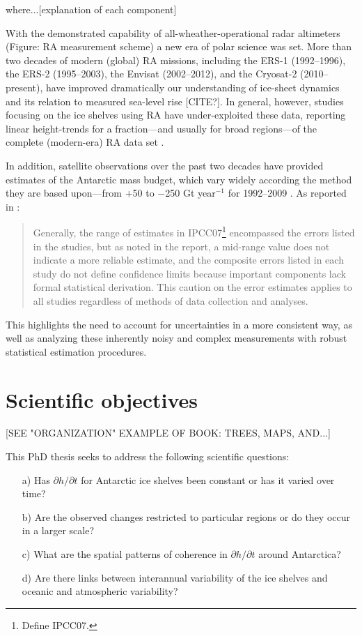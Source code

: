where...[explanation of each component]

With the demonstrated capability of all-wheather-operational radar altimeters
(Figure: RA measurement scheme)
a new era of polar science was set. More than two decades of modern (global) RA missions,
including the ERS-1 (1992--1996), the ERS-2 (1995--2003), the Envisat (2002--2012), and
the Cryosat-2 (2010--present), have improved dramatically our understanding of ice-sheet
dynamics and its relation to measured sea-level rise [CITE?]. In general, however,
studies focusing on the ice shelves using RA have under-exploited these data,
reporting linear height-trends for a fraction---and usually for broad regions---of the complete (modern-era) RA data set \parencite{Shepherd2003, Shepherd2010, Zwally2005}.

In addition, satellite observations over the past two decades have provided estimates of
the Antarctic mass budget, which vary widely according the method they are based upon---from
$+$50 to $-$250 Gt year$^{-1}$ for 1992--2009 \parencite{Zwally2011}. As reported in
\textcite{Zwally2011}:

\begin{quotation}
\noindent
Generally, the range of estimates in IPCC07\footnote{Define IPCC07.} encompassed the errors listed in the studies, but as noted in the report, a mid-range value does not indicate a more reliable estimate, and the composite errors listed in each study do not define confidence limits because important components lack formal statistical derivation. This caution on the error estimates applies to all studies regardless of methods of data collection and analyses.
\end{quotation}

This highlights the need to account for uncertainties in a more consistent way, as well as analyzing these inherently noisy and complex measurements with robust statistical estimation procedures.

\section*{Scientific objectives}

[SEE "ORGANIZATION" EXAMPLE OF BOOK: TREES, MAPS, AND...]

This PhD thesis seeks to address the following scientific questions:

\begin{enumerate}
  \item[a)] Has $\partial h / \partial t$ for Antarctic ice shelves been constant
  or has it varied over time?
  \item[b)] Are the observed changes restricted to particular regions or do they
  occur in a larger scale?
  \item[c)] What are the spatial patterns of coherence in $\partial h / \partial t$
  around Antarctica?
  \item[d)] Are there links between interannual variability of the ice shelves and
  oceanic and atmospheric variability?
\end{enumerate}

